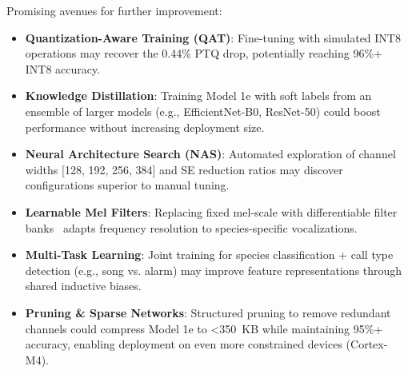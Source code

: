 \documentclass[10pt,a4paper,twoside]{article}
\begin{document}
Promising avenues for further improvement:

\begin{itemize}
	\item \textbf{Quantization-Aware Training (QAT)}: Fine-tuning with simulated INT8 operations may recover the 0.44\% PTQ drop, potentially reaching 96\%+ INT8 accuracy.

	\item \textbf{Knowledge Distillation}: Training Model 1e with soft labels from an ensemble of larger models (e.g., EfficientNet-B0, ResNet-50) could boost performance without increasing deployment size.

	\item \textbf{Neural Architecture Search (NAS)}: Automated exploration of channel widths [128, 192, 256, 384] and SE reduction ratios may discover configurations superior to manual tuning.

	\item \textbf{Learnable Mel Filters}: Replacing fixed mel-scale with differentiable filter banks~\cite{zeghidour2018learning} adapts frequency resolution to species-specific vocalizations.

	\item \textbf{Multi-Task Learning}: Joint training for species classification + call type detection (e.g., song vs. alarm) may improve feature representations through shared inductive biases.

	\item \textbf{Pruning \& Sparse Networks}: Structured pruning to remove redundant channels could compress Model 1e to <350~KB while maintaining 95\%+ accuracy, enabling deployment on even more constrained devices (Cortex-M4).
\end{itemize}



\end{document}
